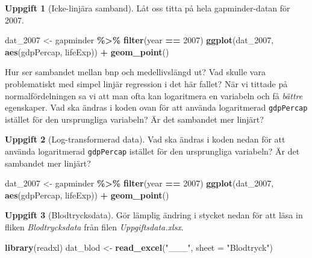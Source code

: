 \documentclass[
]{book}
\newenvironment{Shaded}{\begin{snugshade}}{\end{snugshade}}
\newcommand{\AttributeTok}[1]{\textcolor[rgb]{0.13,0.29,0.53}{#1}}
\newcommand{\DecValTok}[1]{\textcolor[rgb]{0.00,0.00,0.81}{#1}}
\newcommand{\FunctionTok}[1]{\textcolor[rgb]{0.13,0.29,0.53}{\textbf{#1}}}
\newcommand{\NormalTok}[1]{#1}
\newcommand{\OtherTok}[1]{\textcolor[rgb]{0.56,0.35,0.01}{#1}}
\newcommand{\SpecialCharTok}[1]{\textcolor[rgb]{0.81,0.36,0.00}{\textbf{#1}}}
\newcommand{\StringTok}[1]{\textcolor[rgb]{0.31,0.60,0.02}{#1}}
\theoremstyle{definition}
\theoremstyle{definition}
\theoremstyle{definition}
\newtheorem{exercise}{Uppgift}[chapter]
\theoremstyle{definition}
\theoremstyle{remark}
\begin{document}
\begin{exercise}[Icke-linjära samband]
Låt oss titta på hela gapminder-datan för 2007.

\begin{Shaded}
\begin{Highlighting}[]
\NormalTok{dat\_2007 }\OtherTok{\textless{}{-}}\NormalTok{ gapminder }\SpecialCharTok{\%\textgreater{}\%} \FunctionTok{filter}\NormalTok{(year }\SpecialCharTok{==} \DecValTok{2007}\NormalTok{)}
\FunctionTok{ggplot}\NormalTok{(dat\_2007, }\FunctionTok{aes}\NormalTok{(gdpPercap, lifeExp)) }\SpecialCharTok{+} \FunctionTok{geom\_point}\NormalTok{()}
\end{Highlighting}
\end{Shaded}

Hur ser sambandet mellan bnp och medellivslängd ut? Vad skulle vara problematiskt med simpel linjär regression i det här fallet? När vi tittade på normalfördelningen sa vi att man ofta kan logaritmera en variabeln och få \emph{bättre} egenskaper. Vad ska ändras i koden ovan för att använda logaritmerad \texttt{gdpPercap} istället för den ursprungliga variabeln? Är det sambandet mer linjärt?
\end{exercise}

\begin{exercise}[Log-transformerad data]

Vad ska ändras i koden nedan för att använda logaritmerad \texttt{gdpPercap} istället för den ursprungliga variabeln? Är det sambandet mer linjärt?

\begin{Shaded}
\begin{Highlighting}[]
\NormalTok{dat\_2007 }\OtherTok{\textless{}{-}}\NormalTok{ gapminder }\SpecialCharTok{\%\textgreater{}\%} \FunctionTok{filter}\NormalTok{(year }\SpecialCharTok{==} \DecValTok{2007}\NormalTok{)}
\FunctionTok{ggplot}\NormalTok{(dat\_2007, }\FunctionTok{aes}\NormalTok{(gdpPercap, lifeExp)) }\SpecialCharTok{+} \FunctionTok{geom\_point}\NormalTok{()}
\end{Highlighting}
\end{Shaded}

\end{exercise}

\begin{exercise}[Blodtrycksdata]

Gör lämplig ändring i stycket nedan för att läsa in fliken \emph{Blodtrycksdata} från filen \emph{Uppgiftsdata.xlsx}.

\begin{Shaded}
\begin{Highlighting}[]
\FunctionTok{library}\NormalTok{(readxl)}
\NormalTok{dat\_blod }\OtherTok{\textless{}{-}} \FunctionTok{read\_excel}\NormalTok{(}\StringTok{"\_\_\_"}\NormalTok{, }\AttributeTok{sheet =} \StringTok{"Blodtryck"}\NormalTok{)}
\end{Highlighting}
\end{Shaded}

\end{exercise}
\end{document}
